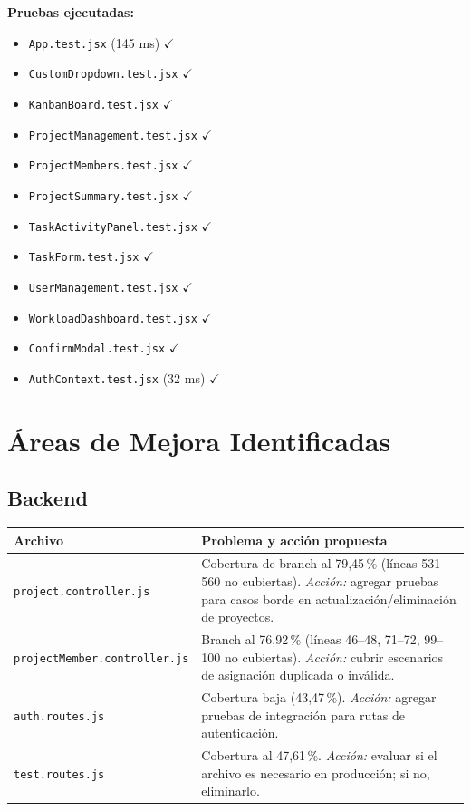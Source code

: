 \documentclass[12pt, a4paper]{article}
\newcommand{\ok}{\textcolor{accentgreen}{$\checkmark$}}
\begin{document}
\textbf{Pruebas ejecutadas:}
\begin{itemize}[leftmargin=1.5em, topsep=2pt, itemsep=2pt]
  \item \texttt{App.test.jsx} (145 ms) \ok
  \item \texttt{CustomDropdown.test.jsx} \ok
  \item \texttt{KanbanBoard.test.jsx} \ok
  \item \texttt{ProjectManagement.test.jsx} \ok
  \item \texttt{ProjectMembers.test.jsx} \ok
  \item \texttt{ProjectSummary.test.jsx} \ok
  \item \texttt{TaskActivityPanel.test.jsx} \ok
  \item \texttt{TaskForm.test.jsx} \ok
  \item \texttt{UserManagement.test.jsx} \ok
  \item \texttt{WorkloadDashboard.test.jsx} \ok
  \item \texttt{ConfirmModal.test.jsx} \ok
  \item \texttt{AuthContext.test.jsx} (32 ms) \ok
\end{itemize}

\section{Áreas de Mejora Identificadas}

\subsection{Backend}

\begin{mejorabox}
\begin{tabularx}{\linewidth}{lX}
\toprule
\textbf{Archivo} & \textbf{Problema y acción propuesta} \\
\midrule
\texttt{project.controller.js} &
  Cobertura de branch al 79,45\,\% (líneas 531--560 no cubiertas).
  \textit{Acción:} agregar pruebas para casos borde en actualización/eliminación de proyectos. \\[4pt]
\texttt{projectMember.controller.js} &
  Branch al 76,92\,\% (líneas 46--48, 71--72, 99--100 no cubiertas).
  \textit{Acción:} cubrir escenarios de asignación duplicada o inválida. \\[4pt]
\texttt{auth.routes.js} &
  Cobertura baja (43,47\,\%).
  \textit{Acción:} agregar pruebas de integración para rutas de autenticación. \\[4pt]
\texttt{test.routes.js} &
  Cobertura al 47,61\,\%.
  \textit{Acción:} evaluar si el archivo es necesario en producción; si no, eliminarlo. \\
\bottomrule
\end{tabularx}
\end{mejorabox}
\end{document}
